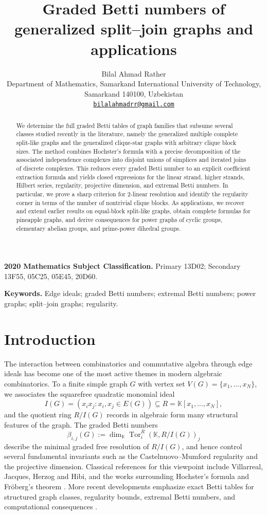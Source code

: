 \documentclass[12pt]{article}
\title{Graded Betti numbers of generalized split--join graphs and applications}
\author{Bilal Ahmad Rather\\[2mm]
	\small Department of Mathematics, Samarkand International University of Technology,\\
	\small Samarkand 140100, Uzbekistan\\
	\texttt{\href{mailto:bilalahmadrr@gmail.com}{bilalahmadrr@gmail.com}}
}
\date{}
\theoremstyle{definition}
\theoremstyle{remark}
\DeclareMathOperator{\Tor}{Tor}
\newcommand{\kk}{\mathbb{K}}
\begin{document}
	
	\maketitle
	
	\begin{abstract}
		We determine the full graded Betti tables of graph families that subsume several classes studied recently in the literature, namely the generalized multiple complete split-like graphs and the generalized clique-star graphs with arbitrary clique block sizes. The method combines Hochster's formula with a precise decomposition of the associated independence complexes into disjoint unions of simplices and iterated joins of discrete complexes. This reduces every graded Betti number to an explicit coefficient extraction formula and yields closed expressions for the linear strand, higher strands, Hilbert series, regularity, projective dimension, and extremal Betti numbers. In particular, we prove a sharp criterion for $2$-linear resolution and identify the regularity corner in terms of the number of nontrivial clique blocks. As applications, we recover and extend earlier results on equal-block split-like graphs, obtain complete formulas for pineapple graphs, and derive consequences for power graphs of cyclic groups, elementary abelian groups, and prime-power dihedral groups. %
	\end{abstract}
	
	\noindent \textbf{2020 Mathematics Subject Classification.} Primary 13D02; Secondary 13F55, 05C25, 05E45, 20D60.
	
	\noindent \textbf{Keywords.} Edge ideals; graded Betti numbers; extremal Betti numbers; power graphs; split--join graphs; regularity.
	
	\section{Introduction}\label{sec:intro}
	
	The interaction between combinatorics and commutative algebra through edge ideals has become one of the most active themes in modern algebraic combinatorics. To a finite simple graph $G$ with vertex set $V(G)=\{x_1,\dots,x_N\}$, we associates the squarefree quadratic monomial ideal
	$$
	I(G)=(x_ix_j:{x_i,x_j}\in E(G))\subseteq R=\kk[x_1,\dots,x_N],
	$$
	and the quotient ring $R/I(G)$ records in algebraic form many structural features of the graph. The graded Betti numbers
	$$
	\beta_{i,j}(G):=\dim_{\kk}\Tor_i^R(\kk,R/I(G))_j
	$$
	describe the minimal graded free resolution of $R/I(G)$, and hence control several fundamental invariants such as the Castelnuovo--Mumford regularity and the projective dimension. Classical references for this viewpoint include Villarreal, Jacques, Herzog and Hibi, and the works surrounding Hochster's formula and Fröberg's theorem \cite{Villarreal1995,Hochster1977,Jacques2004,HerzogHibi2010,Froberg1990}. More recent developments emphasize exact Betti tables for structured graph classes, regularity bounds, extremal Betti numbers, and computational consequences \cite{BayerCharalambousPopescu1999,CorsoNagel2009,HaVanTuyl2008,FernandezRamosGimenez2014,Woodroofe2014,Froberg2022,Froberg2023}.
	
\end{document}
